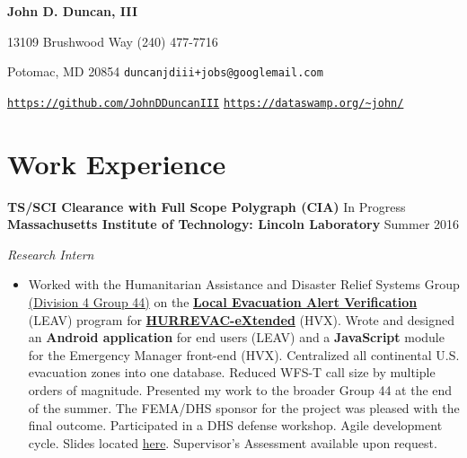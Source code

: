 \documentclass[11pt]{article}
\begin{document}
\fancyfoot{}
\pagestyle{fancy}
\thispagestyle{empty}
\renewcommand{\headrulewidth}{0pt}
\begin{center}
	{\huge \textbf{John D. Duncan, III}}
\end{center}
13109 Brushwood Way
\hfill
(240) 477-7716

Potomac, MD 20854
\hfill
\texttt{duncanjdiii+jobs@googlemail.com}

\texttt{\url{https://github.com/JohnDDuncanIII}}
\hfill
\texttt{\url{https://dataswamp.org/~john/}}

\section*{Work Experience}
\textbf{TS/SCI Clearance with Full Scope Polygraph (CIA)}
\hfill
In Progress \\


\textbf{Massachusetts Institute of Technology: Lincoln Laboratory}
\hfill
Summer 2016

\textit{Research Intern}

\begin{itemize}
\item[] Worked with the Humanitarian Assistance and Disaster Relief Systems Group \href{https://www.ll.mit.edu/employment/division4.html#gp44}{(Division 4 Group 44)} on the \href{https://www.dhs.gov/publication/national-hurricane-program-technology-modernization-local-evacuation-alert-verification}{\textbf{Local Evacuation Alert Verification}} (LEAV) program for \href{https://www.dhs.gov/publication/national-hurricane-program-technology-modernization-hurrevac-extended-hv-x}{\textbf{HURREVAC-eXtended}} (HVX). Wrote and designed an \textbf{Android application} for end users (LEAV) and a \textbf{JavaScript} module for the Emergency Manager front-end (HVX). Centralized all continental U.S. evacuation zones into one database. Reduced WFS-T call size by multiple orders of magnitude. Presented my work to the broader Group 44 at the end of the summer. The FEMA/DHS sponsor for the project was pleased with the final outcome. Participated in a DHS defense workshop. Agile development cycle. Slides located \href{https://docs.google.com/presentation/d/1d6u7eK2fBJElrRpEn1KlkTfReKO_tHj5iCAGb6vgtmg/}{here}. Supervisor's Assessment available upon request. \\
\end{itemize}
\end{document}
